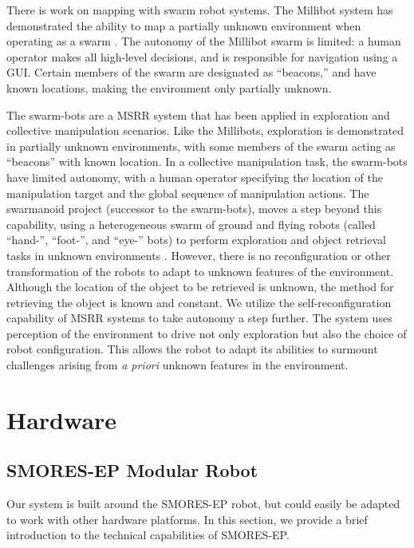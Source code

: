 \documentclass[conference]{IEEEtran}
\begin{document}
There is work on mapping with swarm robot systems. The Millibot system has demonstrated the ability to map a partially unknown environment when operating as a swarm \cite{Grabowski2000}. The autonomy of the Millibot swarm is limited: a human operator makes all high-level decisions, and is responsible for navigation using a GUI. Certain members of the swarm are designated as ``beacons,'' and have known locations, making the environment only partially unknown.

The swarm-bots are a MSRR system that has been applied in exploration \cite{Dorigo2005} and collective manipulation \cite{Mondada2005} scenarios.  Like the Millibots, exploration is demonstrated in partially unknown environments, with some members of the swarm acting as ``beacons'' with known location.  In a collective manipulation task, the swarm-bots have limited autonomy, with a human operator specifying the location of the manipulation target and the global sequence of manipulation actions. The swarmanoid project (successor to the swarm-bots), moves a step beyond this capability, using a heterogeneous swarm of ground and flying robots (called ``hand-'', ``foot-'', and ``eye-'' bots) to perform exploration and object retrieval tasks in unknown environments \cite{Dorigo2013}.  However, there is no reconfiguration or other transformation of the robots to adapt to unknown features of the environment. Although the location of the object to be retrieved is unknown, the method for retrieving the object is known and constant. We utilize the self-reconfiguration capability of MSRR systems to take autonomy a step further. The system uses perception of the environment to drive not only exploration but also the choice of robot configuration. This allows the robot to adapt its abilities to surmount challenges arising from \textit{a priori} unknown features in the environment.


\section{Hardware} %
\label{sec:hardware}
%
\subsection{SMORES-EP Modular Robot} \label{sec:smores}
%
Our system is built around the SMORES-EP robot, but could easily be adapted to
work with other hardware platforms.  In this section, we provide a brief
introduction to the technical capabilities of SMORES-EP.
\end{document}
